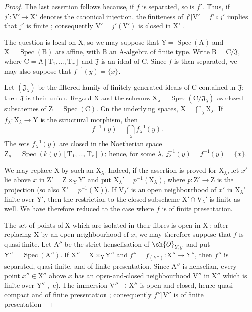 \begin{proof}
The last assertion follows because, if $f$ is separated, so is $f'$. Thus, if $j':\mathrm{V}'\to\mathrm{X}'$ denotes the canonical injection, the finiteness of $f'|\mathrm{V}'=f'\circ j'$ implies that $j'$ is finite ; consequently $\mathrm{V}'=j'(\mathrm{V}')$ is closed in $\mathrm{X}'$ .

The question is local on $\mathrm{X}$, so we may suppose that $\mathrm{Y}=\operatorname{Spec}(\mathrm{A})$ and $\mathrm{X}=\operatorname{Spec}(\mathrm{B})$ are affine, with $\mathrm{B}$ an $\mathrm{A}$-algebra of finite type. Write $\mathrm{B}=\mathrm{C}/\mathfrak{J}$, where $\mathrm{C}=\mathrm{A}[\mathrm{T}_1,\ldots,\mathrm{T}_r]$ and $\mathfrak{J}$ is an ideal of $\mathrm{C}$. Since $f$ is then separated, we may also suppose that $f^{-1}(y)=\{x\}$.

Let $(\mathfrak{J}_\lambda)$ be the filtered family of finitely generated ideals of $\mathrm{C}$ contained in $\mathfrak{J}$; then $\mathfrak{J}$ is their union. Regard $\mathrm{X}$ and the schemes $\mathrm{X}_\lambda=\operatorname{Spec}(\mathrm{C}/\mathfrak{J}_\lambda)$ as closed subschemes of $\mathrm{Z}=\operatorname{Spec}(\mathrm{C})$. On the underlying spaces, $\mathrm{X}=\bigcap_\lambda\mathrm{X}_\lambda$. If $f_\lambda:\mathrm{X}_\lambda\to\mathrm{Y}$ is the structural morphism, then
\[
  f^{-1}(y)=\bigcap_\lambda f_\lambda^{-1}(y).
\]
The sets $f_\lambda^{-1}(y)$ are closed in the Noetherian space $\mathrm{Z}_y=\operatorname{Spec}(k(y)[\mathrm{T}_1,\ldots,\mathrm{T}_r])$; hence, for some $\lambda$, $f_\lambda^{-1}(y)=f^{-1}(y)=\{x\}$.

We may replace $\mathrm{X}$ by such an $\mathrm{X}_\lambda$. Indeed, if the assertion is proved for $\mathrm{X}_\lambda$, let $x'$ lie above $x$ in $\mathrm{Z}'=\mathrm{Z}\times_{\mathrm{Y}}\mathrm{Y}'$ and put $\mathrm{X}_\lambda'=p^{-1}(\mathrm{X}_\lambda)$, where $p:\mathrm{Z}'\to\mathrm{Z}$ is the projection (so also $\mathrm{X}'=p^{-1}(\mathrm{X})$). If $\mathrm{V}_\lambda'$ is an open neighbourhood of $x'$ in $\mathrm{X}_\lambda'$ finite over $\mathrm{Y}'$, then the restriction to the closed subscheme $\mathrm{X}'\cap\mathrm{V}_\lambda'$ is finite as well. We have therefore reduced to the case where $f$ is of finite presentation.

The set of points of $\mathrm{X}$ which are isolated in their fibres is open in $\mathrm{X}$ ; after replacing $\mathrm{X}$ by an open neighbourhood of $x$, we may therefore suppose that $f$ is quasi-finite. Let $\mathrm{A}''$ be the strict henselisation of $\sh{O}_{Y,y}$ and put $\mathrm{Y}''=\operatorname{Spec}(\mathrm{A}'')$. If $\mathrm{X}''=\mathrm{X}\times_{\mathrm{Y}}\mathrm{Y}''$ and $f''=f_{(\mathrm{Y}'')}:\mathrm{X}''\to\mathrm{Y}''$, then $f''$ is separated, quasi-finite, and of finite presentation. Since $\mathrm{A}''$ is henselian, every point $x''\in\mathrm{X}''$ above $x$ has an open-and-closed neighbourhood $\mathrm{V}''$ in $\mathrm{X}''$ which is finite over $\mathrm{Y}''$ ,~c). The immersion $\mathrm{V}''\to\mathrm{X}''$ is open and closed, hence quasi-compact and of finite presentation ; consequently $f''|\mathrm{V}''$ is of finite presentation.


\end{proof}
